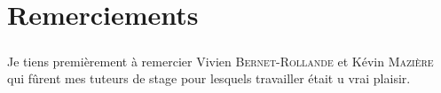 \chapter*{Remerciements}

\paragraph*{}
Je tiens premièrement à remercier Vivien \textsc{Bernet-Rollande} et Kévin \textsc{Mazière} qui fûrent mes tuteurs de stage pour lesquels travailler était u
vrai plaisir.

\paragraph*{}
